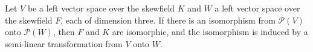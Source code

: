 Let $V$ be a left vector space over the skewfield $K$ and $W$ a left vector space over the skewfield $F$, each of dimension three. If there is an isomorphism from $\mathcal{P}(V)$ onto $\mathcal{P}(W)$, then $F$ and $K$ are isomorphic, and the isomorphism is induced by a semi-linear transformation from $V$ onto $W$.
